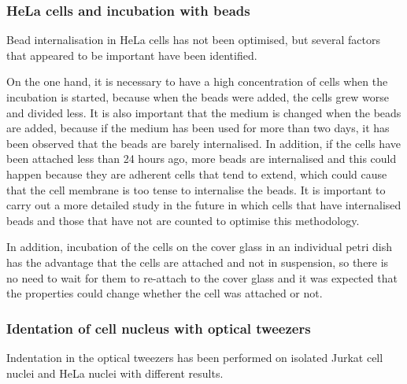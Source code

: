 \documentclass[12pt, a4paper]{article} %
\begin{document}
\setlength{\parskip}{4mm} 

\setlength{\parskip}{0mm}

\subsubsection{HeLa cells and incubation with beads}

Bead internalisation in HeLa cells has not been optimised, but several factors that appeared to be important have been identified.

\setlength{\parskip}{4mm}

 On the one hand, it is necessary to have a high concentration of cells when the incubation is started, because when the beads were added, the cells grew worse and divided less. It is also important that the medium is changed when the beads are added, because if the medium has been used for more than two days, it has been observed that the beads are barely internalised. In addition, if the cells have been attached less than 24 hours ago, more beads are internalised and this could happen because they are adherent cells that tend to extend, which could cause that the cell membrane is too tense to internalise the beads. It is important to carry out a more detailed study in the future in which cells that have internalised beads and those that have not are counted to optimise this methodology.

In addition, incubation of the cells on the cover glass in an individual petri dish has the advantage that the cells are attached and not in suspension, so there is no need to wait for them to re-attach to the cover glass and it was expected that the properties could change whether the cell was attached or not.

\setlength{\parskip}{0mm}

\subsubsection{Identation of cell nucleus with optical tweezers}

Indentation in the optical tweezers has been performed on isolated Jurkat cell nuclei and HeLa nuclei with different results.
\end{document}
